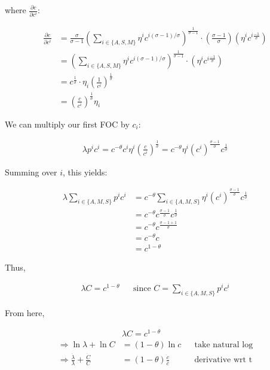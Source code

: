 where $\frac{\partial c}{\partial c^i}$:

\begin{align}
    \frac{\partial c}{\partial c^i} &= \frac{\sigma}{\sigma - 1} \left(\sum_{i \in\{A, S, M\}} \eta^i c^{i (\sigma-1) / \sigma}\right)^{\frac{1}{\sigma-1}} \cdot \left(\frac{\sigma -1}{\sigma}\right) \left( \eta^i c^{i \frac{-1}{\sigma}} \right) \\
    &= \left(\sum_{i \in\{A, S, M\}} \eta^i c^{i (\sigma-1) / \sigma}\right)^{\frac{1}{\sigma-1}} \cdot \left( \eta^i c^{i \frac{-1}{\sigma}} \right) \\
    &= c^{\frac{1}{\sigma}} \cdot \eta_i (\frac{1}{c^i})^{\frac{1}{\sigma}} \\
    &= (\frac{c}{c^i})^{\frac{1}{\sigma}} \eta_i
\end{align}

We can multiply our first FOC by $c_i$:

\begin{align}
    \lambda p^i c^i = c^{-\theta} c^i \eta^i (\frac{c}{c^i})^{\frac{1}{\sigma}} = c^{-\theta} \eta^i (c^i)^{\frac{\sigma - 1}{\sigma}} c^{\frac{1}{\sigma}}
\end{align}

Summing over $i$, this yields:

\begin{align}
    \lambda \sum_{i \in\{A, M, S\}} p^i c^i &= c^{-\theta} \sum_{i \in\{A, M, S\}} \eta^i (c^i)^{\frac{\sigma - 1}{\sigma}} c^{\frac{1}{\sigma}} \\
    &= c^{-\theta} c^{\frac{\sigma -1}{\sigma}} c^{\frac{1}{\sigma}} \\
    &= c^{-\theta} c^{\frac{\sigma -1 + 1}{\sigma}} \\
    &= c^{-\theta} c\\
    &= c^{1-\theta}
\end{align}

Thus,

\begin{align}
    \lambda C = c^{1-\theta} && \text{since } C = \sum_{i \in\{A, M, S\}} p^i c^i
\end{align}

From here,

\begin{align}
    & \lambda C = c^{1-\theta} \\
    \Rightarrow \ln \lambda + \ln C &= (1-\theta) \ln c && \text{take natural log} \\
    \Rightarrow \frac{\dot{\lambda}}{\lambda} + \frac{\dot{C}}{C} &= (1-\theta) \frac{\dot{c}}{c} && \text{derivative wrt t}
\end{align}

